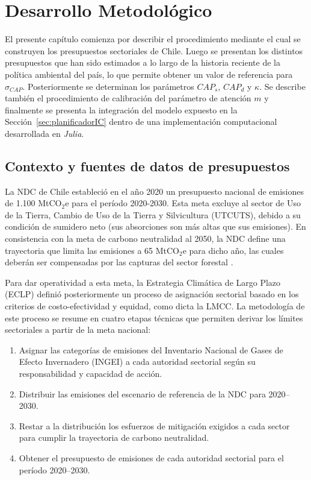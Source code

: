 
\chapter{Desarrollo Metodológico} \label{c3} %
El presente capítulo comienza por describir el procedimiento mediante el cual se construyen los presupuestos sectoriales de Chile. Luego se presentan los distintos presupuestos que han sido estimados a lo largo de la historia reciente de la política ambiental del país, lo que permite obtener un valor de referencia para $\sigma_{CAP}$. Posteriormente se determinan los parámetros $CAP_s$, $CAP_d$ y $\kappa$. Se describe también el procedimiento de calibración del parámetro de atención $m$ y finalmente se presenta la integración del modelo expuesto en la Sección~\ref{sec:planificadorIC} dentro de una implementación computacional desarrollada en \textit{Julia}.
\section{Contexto y fuentes de datos de presupuestos}
\label{3.1}
La NDC de Chile estableció en el año 2020 un presupuesto nacional de emisiones de 1.100 MtCO$_2$e para el período 2020-2030. Esta meta excluye al sector de Uso de la Tierra, Cambio de Uso de la Tierra y Silvicultura (UTCUTS), debido a su condición de sumidero neto (sus absorciones son más altas que sus emisiones). En consistencia con la meta de carbono neutralidad al 2050, la NDC define una trayectoria que limita las emisiones a 65 MtCO$_2$e para dicho año, las cuales deberán ser compensadas por las capturas del sector forestal \cite{gobierno_de_chile_estrategia_2021}. \medskip 

Para dar operatividad a esta meta, la Estrategia Climática de Largo Plazo (ECLP) definió posteriormente un proceso de asignación sectorial basado en los criterios de costo-efectividad y equidad, como dicta la LMCC. La metodología de este proceso se resume en cuatro etapas técnicas que permiten derivar los límites sectoriales a partir de la meta nacional:

\begin{enumerate}
    \item Asignar las categorías de emisiones del Inventario Nacional de Gases de Efecto Invernadero (INGEI) a cada autoridad sectorial según su responsabilidad y capacidad de acción.
    \item Distribuir las emisiones del escenario de referencia de la NDC para 2020–2030.
    \item Restar a la distribución los esfuerzos de mitigación exigidos a cada sector para cumplir la trayectoria de carbono neutralidad.
    \item Obtener el presupuesto de emisiones de cada autoridad sectorial para el período 2020–2030.
\end{enumerate}

